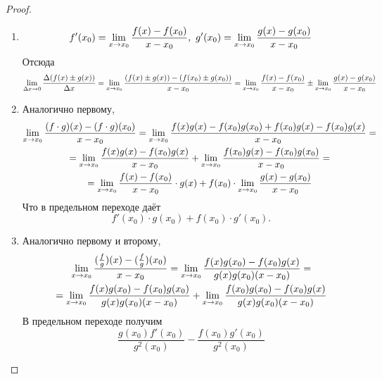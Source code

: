 \begin{proof}~
	\begin{enumerate}
		\item 
		\[
			f'(x_0) = \liml_{x \to x_0} \frac{f(x) - f(x_0)}{x - x_0},\ 
			g'(x_0) = \liml_{x \to x_0} \frac{g(x) - g(x_0)}{x - x_0}
		\]
		Отсюда
		\[
			\lim\limits_{\Delta x \to 0}
			\frac{\Delta (f(x) \pm g(x))}{\Delta x} = 
			\lim\limits_{x \to x_0} \frac{(f(x) \pm g(x)) -
			(f(x_0) \pm g(x_0))}{x - x_0} = \lim\limits_{x \to x_0}
			\frac{f(x) - f(x_0)}{x - x_0} \pm \lim\limits_{x \to x_0}
			\frac{g(x) - g(x_0)}{x - x_0}
		\]
		
		\item Аналогично первому,
		\begin{multline*}
			\lim\limits_{x \to x_0} \frac{(f \cdot g)(x) - (f \cdot g)(x_0)}{x - x_0} =
			\lim\limits_{x \to x_0} \frac{f(x)g(x) - f(x_0)g(x_0) + f(x_0)g(x) - f(x_0)g(x)}{x - x_0} =\\
			= \lim\limits_{x \to x_0} \frac{f(x)g(x) - f(x_0)g(x)}{x - x_0} +
			\lim\limits_{x \to x_0} \frac{f(x_0)g(x) - f(x_0)g(x_0)}{x - x_0} = \\
			= \lim\limits_{x \to x_0} \frac{f(x) - f(x_0)}{x - x_0} \cdot g(x) + f(x_0)
			\cdot \lim\limits_{x \to x_0} \frac{g(x) - g(x_0)}{x - x_0}
		\end{multline*}
		Что в предельном переходе даёт
		\[
			f'(x_0) \cdot g(x_0) + f(x_0) \cdot g'(x_0).
		\]
		
		\item Аналогично первому и второму,
		\begin{multline*}
			\lim\limits_{x \to x_0} \frac{(\frac{f}{g})(x) -
			(\frac{f}{g})(x_0)}{x - x_0} =
			\lim\limits_{x \to x_0} \frac{f(x)g(x_0) - f(x_0)g(x)}{g(x)g(x_0)(x - x_0)} =\\
			= \lim\limits_{x \to x_0} \frac{f(x)g(x_0) - f(x_0)g(x_0)}{g(x)g(x_0)(x - x_0)} +
			\lim\limits_{x \to x_0} \frac{f(x_0)g(x_0) - f(x_0)g(x)}{g(x)g(x_0)(x - x_0)}
		\end{multline*}
		В предельном переходе получим
		\[
			\frac{g(x_0)f'(x_0)}{g^2(x_0)} - \frac{f(x_0)g'(x_0)}{g^2(x_0)}
		\]
	\end{enumerate}
\end{proof}

